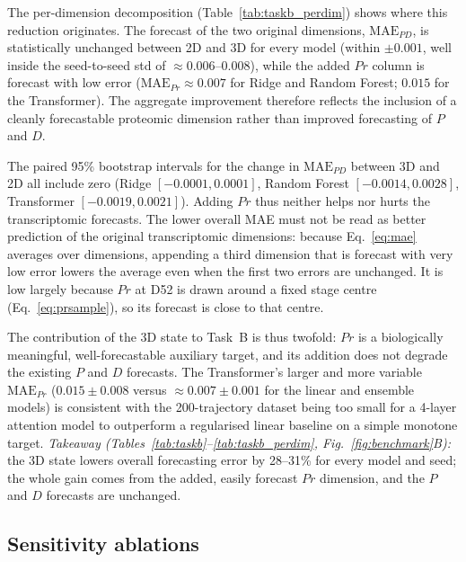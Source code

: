 \documentclass[5p,times,twocolumn]{elsarticle}
\newcommand{\rtag}[1]{}
\newcommand{\rev}[2]{\rtag{#1}#2}
\newenvironment{revblock}[1]{\par\rtag{#1}\ignorespaces}{\par}
\begin{document}
The per-dimension decomposition (Table~\ref{tab:taskb_perdim})
shows where this reduction originates.
The forecast of the two original dimensions, $\text{MAE}_{PD}$,
is statistically unchanged between 2D and 3D for every model
(within $\pm 0.001$, well inside the seed-to-seed std of
$\approx 0.006$--$0.008$), while the added $Pr$ column is
forecast with low error ($\text{MAE}_{Pr} \approx 0.007$ for
Ridge and Random Forest; $0.015$ for the Transformer).
The aggregate improvement therefore reflects the inclusion of a
cleanly forecastable proteomic dimension rather than improved
forecasting of $P$ and $D$.
\begin{revblock}{R2.13,R1.9}
  The paired 95\% bootstrap intervals for the change in
  $\text{MAE}_{PD}$ between 3D and 2D all include zero (Ridge
  $[-0.0001, 0.0001]$, Random Forest $[-0.0014, 0.0028]$,
  Transformer $[-0.0019, 0.0021]$). Adding $Pr$ thus neither helps
  nor hurts the transcriptomic forecasts. The lower overall MAE
  must not be read as better prediction of the original
  transcriptomic dimensions: because Eq.~\eqref{eq:mae} averages
  over dimensions, appending a third dimension that is forecast
  with very low error lowers the average even when the first two
  errors are unchanged. It is low largely because $Pr$ at D52 is
  drawn around a fixed stage centre (Eq.~\eqref{eq:prsample}), so
  its forecast is close to that centre.
\end{revblock}
The contribution of the 3D state to Task~B is thus twofold:
$Pr$ is a biologically meaningful, well-forecastable auxiliary
target, and its addition does not degrade the existing $P$ and
$D$ forecasts.
The Transformer's larger and more variable $\text{MAE}_{Pr}$
($0.015 \pm 0.008$ versus $\approx 0.007 \pm 0.001$ for the
linear and ensemble models) is consistent with the
200-trajectory dataset being too small for a 4-layer attention
model to outperform a regularised linear baseline on a simple
monotone target.
\rev{R1.13}{\textit{Takeaway (Tables~\ref{tab:taskb}--\ref{tab:taskb_perdim},
    Fig.~\ref{fig:benchmark}B):} the 3D state lowers overall
  forecasting error by 28--31\% for every model and seed; the
  whole gain comes from the added, easily forecast $Pr$
  dimension, and the $P$ and $D$ forecasts are unchanged.}

\subsection{\textbf{Sensitivity ablations}}
\label{sec:res_ablations}
\end{document}
